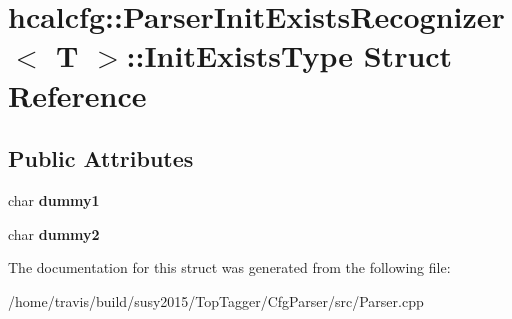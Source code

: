 \hypertarget{structhcalcfg_1_1ParserInitExistsRecognizer_1_1InitExistsType}{\section{hcalcfg\-:\-:Parser\-Init\-Exists\-Recognizer$<$ T $>$\-:\-:Init\-Exists\-Type Struct Reference}
\label{structhcalcfg_1_1ParserInitExistsRecognizer_1_1InitExistsType}
}
\subsection*{Public Attributes}
\begin{DoxyCompactItemize}
\item 
\hypertarget{structhcalcfg_1_1ParserInitExistsRecognizer_1_1InitExistsType_a2fc61d9af56981864327d3338dda7026}{char {\bfseries dummy1}}\label{structhcalcfg_1_1ParserInitExistsRecognizer_1_1InitExistsType_a2fc61d9af56981864327d3338dda7026}

\item 
\hypertarget{structhcalcfg_1_1ParserInitExistsRecognizer_1_1InitExistsType_ae89b7adefe99bc3fa6708783213f8c47}{char {\bfseries dummy2}}\label{structhcalcfg_1_1ParserInitExistsRecognizer_1_1InitExistsType_ae89b7adefe99bc3fa6708783213f8c47}

\end{DoxyCompactItemize}


The documentation for this struct was generated from the following file\-:\begin{DoxyCompactItemize}
\item 
/home/travis/build/susy2015/\-Top\-Tagger/\-Cfg\-Parser/src/Parser.\-cpp\end{DoxyCompactItemize}
